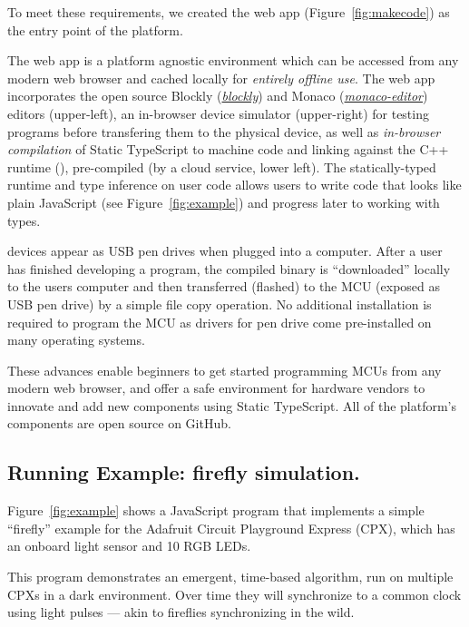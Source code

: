 To meet these requirements, we created the \MC web app (Figure~\ref{fig:makecode}) as the entry point of the platform.

The \MC web app is a platform agnostic environment which can be accessed from any modern web browser and cached locally for \emph{entirely offline use}. The \MC web app incorporates the open source Blockly (\emph{\href{https://github.com/google/blockly}{blockly}}) and Monaco (\emph{\href{https://github.com/Microsoft/monaco-editor}{monaco-editor}}) editors (upper-left), an in-browser device simulator (upper-right) for testing programs before transfering them to the physical device, as well as \emph{in-browser compilation} of Static TypeScript to machine code and linking against the C++ runtime (\emph{\CON}), pre-compiled (by a cloud service, lower left). The statically-typed runtime and type inference on user code allows users to write code that looks like plain JavaScript (see Figure~\ref{fig:example}) and progress later to working with types.

\MC devices appear as USB pen drives when plugged into a computer. After a user has finished developing a program, the compiled binary is ``downloaded'' locally to the users computer and then transferred (flashed) to the MCU (exposed as USB pen drive) by a simple file copy operation. No additional installation is required to program the MCU as drivers for pen drive come pre-installed on many operating systems.

These advances enable beginners to get started programming MCUs from any modern web browser, and offer a safe environment for hardware vendors to innovate and add new components using Static TypeScript. All of the platform's components are open source on GitHub.

\subsection{Running Example: firefly simulation.}

Figure~\ref{fig:example} shows a JavaScript
program that implements a simple ``firefly'' example
for the Adafruit Circuit Playground Express (CPX), which has an onboard light sensor and 10 RGB LEDs.

This program demonstrates an emergent, time-based algorithm, run on multiple CPXs in a dark environment. Over time they will synchronize to a common clock using light pulses --- akin to fireflies synchronizing in the wild.



